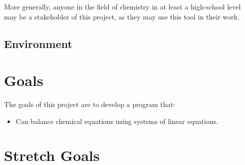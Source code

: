 \documentclass{article}
\begin{document}
More generally, anyone in the field of chemistry in at least a high-school level
may be a stakeholder of this project, as they may use this tool in their work.

\subsection{Environment}


\section{Goals}

The goals of this project are to develop a program that:

\begin{itemize}
    \item Can balance chemical equations using systems of linear equations.
\end{itemize}

\section{Stretch Goals}



\end{document}
